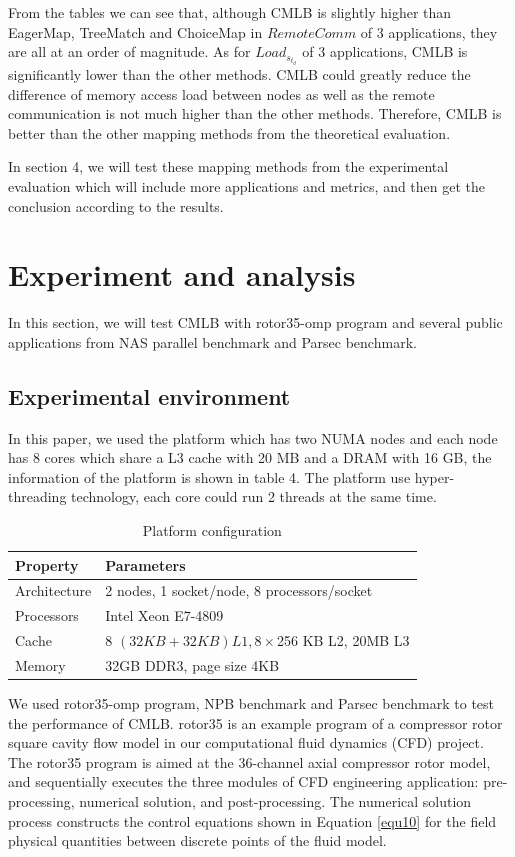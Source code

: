 \documentclass[a4paper,fleqn]{cas-sc}
\begin{document}
From the tables we can see that, although CMLB is slightly higher than EagerMap, TreeMatch and ChoiceMap in $RemoteComm$ of  3 applications, they are all at an order of magnitude. As for $Load_s_t_d$ of 3 applications, CMLB is significantly lower than the other methods. CMLB could greatly reduce the difference of memory access load between nodes as well as the remote communication is not much higher than the other methods. Therefore, CMLB is better than the other mapping methods from the theoretical evaluation.

In section 4, we will test these mapping methods from the experimental evaluation which will include more applications and metrics, and then get the conclusion according to the results.


\section{Experiment and analysis} \label{sect4}
In this section, we will test CMLB with rotor35-omp program and several public applications from NAS parallel benchmark and Parsec benchmark. 
\subsection{Experimental environment}

In this paper, we used the platform which has two NUMA nodes and each node has 8 cores which share a L3 cache with 20 MB and a DRAM with 16 GB, the information of the platform is shown in table 4. The platform use hyper-threading technology, each core could run 2 threads at the same time.

\begin{table}[width=.71\linewidth,cols=6,pos=h]
	\caption{Platform configuration}\label{tbl1}
	\begin{tabular*}{\tblwidth}{@{} LL@{} }
		\toprule
		Property & Parameters \\
		\midrule
		Architecture & 2 nodes, 1 socket/node, 8 processors/socket \\
		Processors & Intel Xeon E7-4809 \\
		Cache & 8 \times$(32 KB+32 KB) L1, 8 \times$256 KB L2, 20MB L3 \\
		Memory & 32GB DDR3, page size 4KB \\
		\bottomrule
	\end{tabular*}
\end{table}
We used rotor35-omp program, NPB benchmark and Parsec benchmark to test the performance of CMLB. rotor35 is an example program of a compressor rotor square cavity flow model in our computational fluid dynamics (CFD) project. The rotor35 program is aimed at the 36-channel axial compressor rotor model, and sequentially executes the three modules of CFD engineering application: pre-processing, numerical solution, and post-processing. The numerical solution process constructs the control equations shown in Equation \ref{equ10} for the field physical quantities between discrete points of the fluid model.
\end{document}
